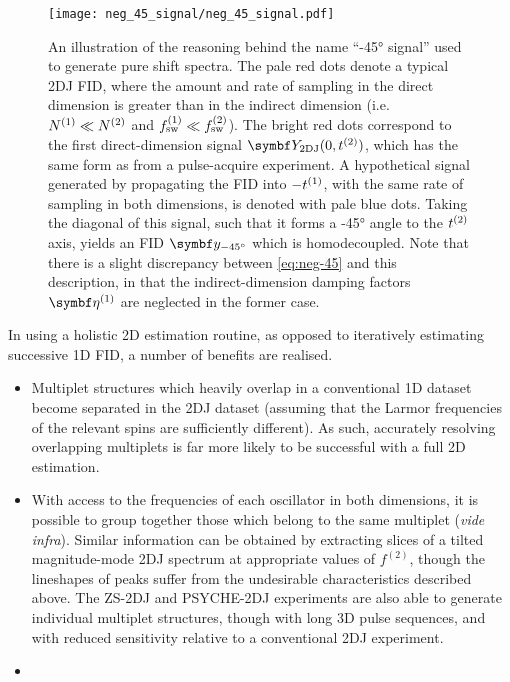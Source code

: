 \begin{figure}
    \centering
    \texttt{[image: neg\_45\_signal/neg\_45\_signal.pdf]}
    \caption[
        An illustration of the reasoning behind the name ``\ang{-45}
        signal'' used to generate pure shift spectra.
    ]{
        An illustration of the reasoning behind the name ``\ang{-45}
        signal'' used to generate pure shift spectra. The pale red dots denote
        a typical \ac{2DJ} \ac{FID}, where
        the amount and rate of sampling in the direct dimension is greater than
        in the indirect dimension (i.e. $N^{(1)} \ll N^{(2)}$ and $f_{\mathrm{sw}}^{(1)} \ll
        f_{\mathrm{sw}}^{(2)}$). The bright red dots correspond to the first direct-dimension
        signal $\bY_{\text{2DJ}}(0, \ttwo)$, which has the same form as
         from a pulse-acquire experiment. A hypothetical signal
        generated by propagating the \ac{FID} into $-t^{(1)}$, with the same rate
        of sampling in both dimensions, is denoted with pale blue dots. Taking
        the diagonal of this signal, such that it forms a \ang{-45} angle to the
        $t^{(2)}$ axis, yields an \ac{FID} $\by_{\ang{-45}}$  which is
        homodecoupled. Note that there is a slight discrepancy
        between \eqref{eq:neg-45} and this description, in that the
        indirect-dimension damping factors $\bdetaone$ are neglected in the
        former case.
    }
    \label{fig:neg-45}
\end{figure}

In using a holistic \ac{2D} estimation routine, as opposed to iteratively
estimating successive \ac{1D} \acs{FID}, a number of benefits are realised.
\begin{itemize}
    \item Multiplet structures which heavily overlap in a conventional \ac{1D}
        dataset become separated in the \ac{2DJ} dataset (assuming that the
        Larmor frequencies of the relevant spins are sufficiently different).
        As such, accurately resolving overlapping multiplets is far more likely
        to be successful with a full \ac{2D} estimation.
    \item With access to the frequencies of each oscillator in both dimensions,
        it is possible to group together those which belong to the same
        multiplet (\emph{vide infra}). Similar information can be obtained by
        extracting slices of a tilted magnitude-mode \ac{2DJ} spectrum at
        appropriate values of $f^{(2)}$, though the lineshapes of peaks suffer
        from the undesirable characteristics described above. The
        \ac{ZS}-\ac{2DJ}\cite{Pell2007} and
        \ac{PSYCHE}-\ac{2DJ}\cite{Foroozandeh2015,Kiraly2017} experiments are
        also able to generate individual multiplet structures, though with
        long \ac{3D} pulse sequences, and with reduced sensitivity relative
        to a conventional \ac{2DJ} experiment.
    \item {}
\end{itemize}

